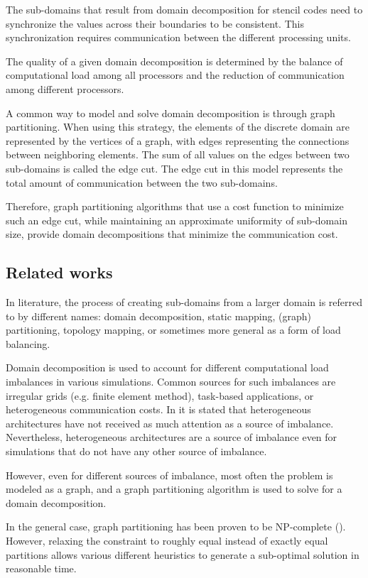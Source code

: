 The sub-domains that result from domain decomposition for stencil codes need to synchronize the values across their boundaries to be consistent.
This synchronization requires communication between the different processing units.

The quality of a given domain decomposition is determined by the balance of computational load among all processors and the reduction of communication among different processors.

A common way to model and solve domain decomposition is through graph partitioning.
When using this strategy, the elements of the discrete domain are represented by the vertices of a graph, with edges representing the connections between neighboring elements.
The sum of all values on the edges between two sub-domains is called the edge cut.
The edge cut in this model represents the total amount of communication between the two sub-domains.

Therefore, graph partitioning algorithms that use a cost function to minimize such an edge cut, while maintaining an approximate uniformity of sub-domain size, provide domain decompositions that minimize the communication cost.

\subsection{Related works}
\label{sec:relwork}
In literature, the process of creating sub-domains from a larger domain is referred to by different names: domain decomposition, static mapping, (graph) partitioning, topology mapping, or sometimes more general as a form of load balancing.

Domain decomposition is used to account for different computational load imbalances in various simulations.
Common sources for such imbalances are irregular grids (e.g. finite element method), task-based applications, or heterogeneous communication costs.
In \citet{saxena2015architecture} it is stated that heterogeneous architectures have not received as much attention as a source of imbalance.
Nevertheless, heterogeneous architectures are a source of imbalance even for simulations that do not have any other source of imbalance.

However, even for different sources of imbalance, most often the problem is modeled as a graph, and a graph partitioning algorithm is used to solve for a domain decomposition.

In the general case, graph partitioning has been proven to be NP-complete (\citet{feldmann2015balanced}).
However, relaxing the constraint to roughly equal instead of exactly equal partitions allows various different heuristics to generate a sub-optimal solution in reasonable time.

